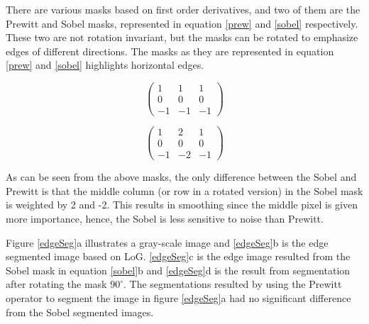 There are various masks based on first order derivatives, and two of them are the Prewitt and Sobel masks, represented in equation \ref{prew} and \ref{sobel} respectively. These two are not rotation invariant, but the masks can be rotated to emphasize edges of different directions. The masks as they are represented in equation \ref{prew} and \ref{sobel} highlights horizontal edges.
\newline
\newline
\begin{minipage}{.45\textwidth}
\begin{equation}
\begin{pmatrix}
1 & 1 & 1 \\
0 & 0 & 0 \\
-1 & -1 & -1
\end{pmatrix}
\label{prew}
\end{equation}
\end{minipage}
\begin{minipage}{.45\textwidth}
\begin{equation}
\begin{pmatrix}
1 & 2 & 1 \\
0 & 0 & 0 \\
-1 & -2 & -1
\end{pmatrix}
\label{sobel}
\end{equation}
\end{minipage}
\newline
\newline
As can be seen from the above masks, the only difference between the Sobel and Prewitt is that the middle column (or row in a rotated version) in the Sobel mask is weighted by 2 and -2. This results in smoothing since the middle pixel is given more importance, hence, the Sobel is less sensitive to noise than Prewitt. 

Figure \ref{edgeSeg}a illustrates a gray-scale image and \ref{edgeSeg}b is the edge segmented image based on LoG. \ref{edgeSeg}c is the edge image resulted from the Sobel mask in equation \ref{sobel}b and \ref{edgeSeg}d is the result from segmentation after rotating the mask \(90^\circ\). The segmentations resulted by using the Prewitt operator to segment the image in figure \ref{edgeSeg}a had no significant difference from the Sobel segmented images.


